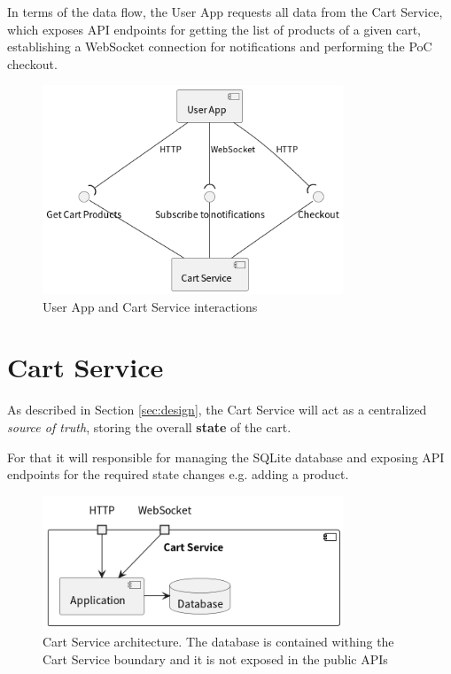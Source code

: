 \documentclass[openright]{normas-utf-tex} %
\begin{document}
In terms of the data flow, the User App requests all data from the Cart Service, which exposes API endpoints for
getting the list of products of a given cart, establishing a WebSocket connection for notifications and performing
the PoC checkout.

\begin{figure}[H]
	\centering
	\includegraphics[width=0.8\textwidth]{./images/diagrams/UserApp.png}
	\caption[User App and Cart Service interactions]{User App and Cart Service interactions}
	\label{fig:dummy}
\end{figure}

\section{Cart Service}

As described in Section \ref{sec:design}, the Cart Service will act as a
centralized \textit{source of truth}, storing the overall \textbf{state} of the
cart.

For that it will responsible for managing the SQLite database and exposing API
endpoints for the required state changes e.g. adding a product.

\begin{figure}[H]
	\centering
	\includegraphics[width=0.8\textwidth]{./images/diagrams/CartService.png}
	\caption[Cart Service architecture]{Cart Service architecture. The database is contained withing the Cart Service boundary and it is not exposed in the public APIs}
	\label{fig:dummy}
\end{figure}
\end{document}
